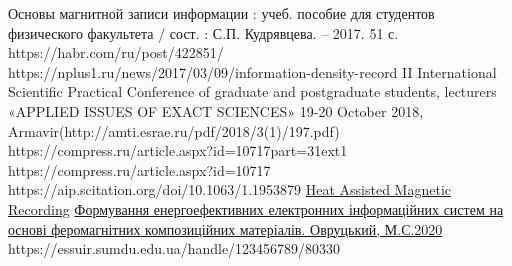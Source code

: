 \documentclass[a4paper,14pt]{extreport}
\begin{document}
\begin{thebibliography}{9}
 Основы магнитной записи информации : учеб. пособие для студентов физического факультета / сост. : С.П. Кудрявцева. – 2017. 51 с.
 https://habr.com/ru/post/422851/
 https://nplus1.ru/news/2017/03/09/information-density-record
 II International Scientific Practical Conference of graduate and postgraduate students,
lecturers «APPLIED ISSUES OF EXACT SCIENCES»
19-20 October 2018, Armavir(http://amti.esrae.ru/pdf/2018/3(1)/197.pdf)
 https://compress.ru/article.aspx?id=10717part=31ext1
 https://compress.ru/article.aspx?id=10717
 https://aip.scitation.org/doi/10.1063/1.1953879
 \href{https://www.researchgate.net/publication/224354512_Heat_Assisted_Magnetic_Recording}{Heat Assisted Magnetic Recording}
  \href{https://essuir.sumdu.edu.ua/handle/123456789/80094}{Формування енергоефективних електронних інформаційних систем на основі феромагнітних композиційних матеріалів. Овруцький, М.С.2020}
 https://essuir.sumdu.edu.ua/handle/123456789/80330
\end{thebibliography}
\end{document}
